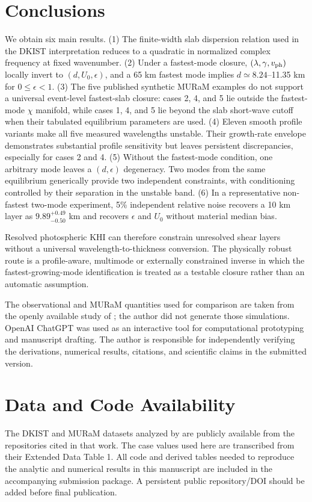 \documentclass[linenumbers]{aastex7}
\begin{document}
\section{Conclusions}
We obtain six main results.
(1) The finite-width slab dispersion relation used in the DKIST interpretation reduces to a quadratic in normalized complex frequency at fixed wavenumber.
(2) Under a fastest-mode closure, $(\lambda,\gamma,v_{\rm ph})$ locally invert to $(d,U_0,\epsilon)$, and a 65 km fastest mode implies $d\simeq8.24$--11.35 km for $0\leq\epsilon<1$.
(3) The five published synthetic MURaM examples do not support a universal event-level fastest-slab closure: cases 2, 4, and 5 lie outside the fastest-mode $\chi$ manifold, while cases 1, 4, and 5 lie beyond the slab short-wave cutoff when their tabulated equilibrium parameters are used.
(4) Eleven smooth profile variants make all five measured wavelengths unstable. Their growth-rate envelope demonstrates substantial profile sensitivity but leaves persistent discrepancies, especially for cases 2 and 4.
(5) Without the fastest-mode condition, one arbitrary mode leaves a $(d,\epsilon)$ degeneracy. Two modes from the same equilibrium generically provide two independent constraints, with conditioning controlled by their separation in the unstable band.
(6) In a representative non-fastest two-mode experiment, 5\% independent relative noise recovers a 10 km layer as $9.89^{+0.49}_{-0.50}$ km and recovers $\epsilon$ and $U_0$ without material median bias.

Resolved photospheric KHI can therefore constrain unresolved shear layers without a universal wavelength-to-thickness conversion. The physically robust route is a profile-aware, multimode or externally constrained inverse in which the fastest-growing-mode identification is treated as a testable closure rather than an automatic assumption.

\begin{acknowledgments}
The observational and MURaM quantities used for comparison are taken from the openly available study of \citet{Kuridze2026}; the author did not generate those simulations. OpenAI ChatGPT \citep{OpenAI2026} was used as an interactive tool for computational prototyping and manuscript drafting. The author is responsible for independently verifying the derivations, numerical results, citations, and scientific claims in the submitted version.
\end{acknowledgments}


\section*{Data and Code Availability}
The DKIST and MURaM datasets analyzed by \citet{Kuridze2026} are publicly available from the repositories cited in that work. The case values used here are transcribed from their Extended Data Table 1. All code and derived tables needed to reproduce the analytic and numerical results in this manuscript are included in the accompanying submission package. A persistent public repository/DOI should be added before final publication.



\end{document}
